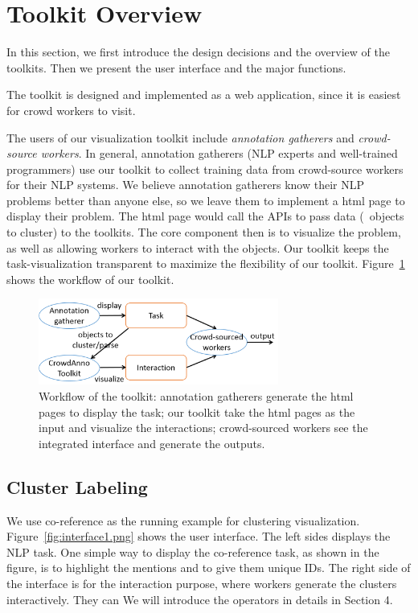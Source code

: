 \section{Toolkit Overview}

In this section, we first introduce the design decisions and the
overview of the toolkits. Then we present the user interface and the
major functions.

The toolkit is designed and implemented as a web application, since it
is easiest for crowd workers to visit.

The users of our visualization toolkit include {\em annotation
gatherers} and {\em crowd-source workers}. In general, annotation
gatherers (NLP experts and well-trained programmers) use our toolkit
to collect training data from crowd-source workers for their NLP
systems. We believe annotation gatherers know their NLP problems
better than anyone else, so we leave them to implement a html page to
display their problem. The html page would call the APIs to pass data
(\eg\ objects to cluster) to the toolkits. The core component then is
to visualize the problem, as well as allowing workers to interact with
the objects. Our toolkit keeps the task-visualization transparent to
maximize the flexibility of our toolkit. Figure~\ref{fig:workflow}
shows the workflow of our toolkit.

\begin{figure}
\centering
\includegraphics[width=3.1in]{figs/workflow.png}
\caption{Workflow of the toolkit: annotation gatherers generate the
html pages to display the task; our toolkit take the html pages as the
input and visualize the interactions; crowd-sourced workers see the
integrated interface and generate the outputs. }
\label{fig:workflow}
\end{figure}

\subsection{Cluster Labeling}

We use co-reference as the running example for clustering
visualization. Figure~\ref{fig:interface1.png} shows the user
interface. The left sides displays the NLP task. One simple way to
display the co-reference task, as shown in the figure, is to highlight
the mentions and to give them unique IDs. The right side of the
interface is for the interaction purpose, where workers generate the
clusters interactively. They can We will introduce the operators in
details in Section 4.

